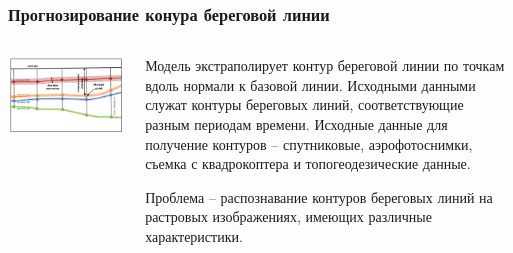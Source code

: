 \documentclass[10pt]{beamer}
\begin{document}
\begin{frame}[fragile]
\begin{columns}
\begin{column}{0.5\linewidth}
    \end{column}
  \end{columns}
\end{frame}

\begin{frame}[fragile]
  \frametitle{Прогнозирование конура береговой линии}
  \begin{columns}
    \begin{column}{0.6\linewidth}
      \includegraphics[width=\linewidth]{dsas-model.png}
    \end{column}
    \begin{column}{0.4\linewidth}
      Модель экстраполирует контур береговой линии по точкам вдоль нормали к базовой линии.  Исходными данными служат контуры береговых линий, соответствующие разным периодам времени.  Исходные данные для получение контуров -- спутниковые, аэрофотоснимки, съемка с квадрокоптера и топогеодезические данные.

      Проблема -- распознавание контуров береговых линий на растровых изображениях, имеющих различные характеристики.
    \end{column}
  \end{columns}
\end{frame}
\end{document}
